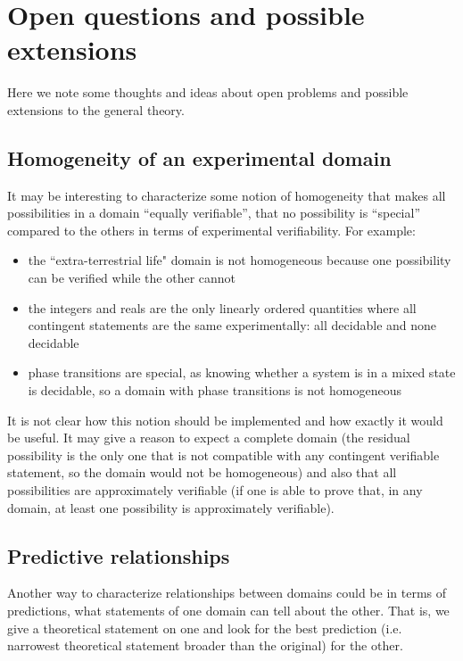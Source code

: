 \documentclass[11pt,letterpaper,fleqn]{memoir} %
\begin{document}
\section{Open questions and possible extensions}\label{sec:general_theory_extensions}

Here we note some thoughts and ideas about open problems and possible extensions to the general theory.

\subsection{Homogeneity of an experimental domain}

It may be interesting to characterize some notion of homogeneity that makes all possibilities in a domain ``equally verifiable'', that no possibility is ``special'' compared to the others in terms of experimental verifiability. For example:
\begin{itemize}
	\item the ``extra-terrestrial life" domain is not homogeneous because one possibility can be verified while the other cannot
	\item the integers and reals are the only linearly ordered quantities where all contingent statements are the same experimentally: all decidable and none decidable
	\item phase transitions are special, as knowing whether a system is in a mixed state is decidable, so a domain with phase transitions is not homogeneous
\end{itemize}

It is not clear how this notion should be implemented and how exactly it would be useful. It may give a reason to expect a complete domain (the residual possibility is the only one that is not compatible with any contingent verifiable statement, so the domain would not be homogeneous) and also that all possibilities are approximately verifiable (if one is able to prove that, in any domain, at least one possibility is approximately verifiable).

\subsection{Predictive relationships}

Another way to characterize relationships between domains could be in terms of predictions, what statements of one domain can tell about the other. That is, we give a theoretical statement on one and look for the best prediction (i.e. narrowest theoretical statement broader than the original) for the other.
\end{document}
